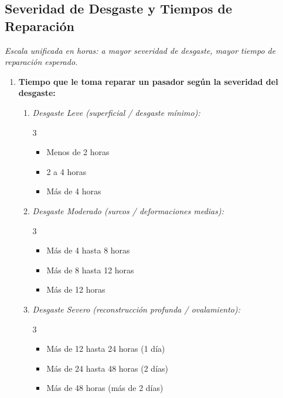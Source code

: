 \documentclass[11pt,a4paper]{article}
\begin{document}
\subsection*{Severidad de Desgaste y Tiempos de Reparación}
\noindent\textit{Escala unificada en horas: a mayor severidad de desgaste, mayor tiempo de reparación esperado.}
\begin{enumerate}[resume=encuesta, leftmargin=*]
    \item \textbf{Tiempo que le toma reparar un pasador según la severidad del desgaste:}
    \begin{enumerate}[label=\alph*), leftmargin=*]
        \item \textit{Desgaste Leve (superficial / desgaste mínimo):}
        \begin{multicols}{3}
        \begin{itemize}[label=$\square$, leftmargin=*]
            \item Menos de 2 horas
            \item 2 a 4 horas
            \item Más de 4 horas
        \end{itemize}
        \end{multicols}

        \item \textit{Desgaste Moderado (surcos / deformaciones medias):}
        \begin{multicols}{3}
        \begin{itemize}[label=$\square$, leftmargin=*]
            \item Más de 4 hasta 8 horas
            \item Más de 8 hasta 12 horas
            \item Más de 12 horas
        \end{itemize}
        \end{multicols}

        \item \textit{Desgaste Severo (reconstrucción profunda / ovalamiento):}
        \begin{multicols}{3}
        \begin{itemize}[label=$\square$, leftmargin=*]
            \item Más de 12 hasta 24 horas (1 día)
            \item Más de 24 hasta 48 horas (2 días)
            \item Más de 48 horas (más de 2 días)
        \end{itemize}
        \end{multicols}
    \end{enumerate}


\end{enumerate}
\end{document}
